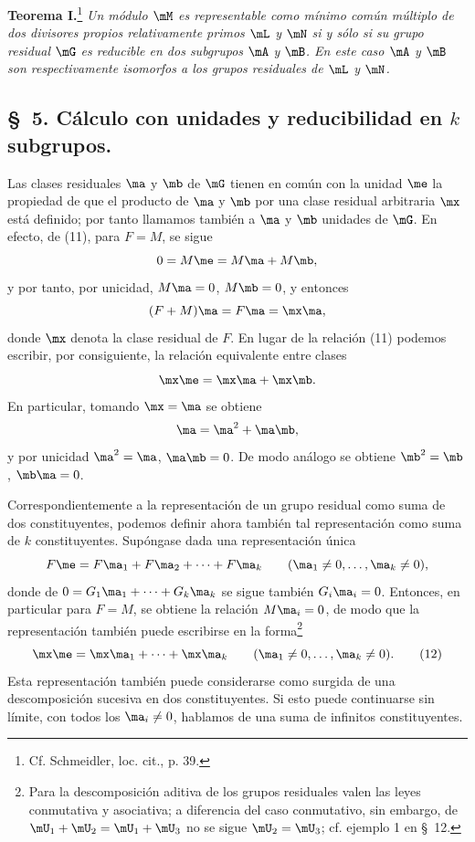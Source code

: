 \documentclass[11pt]{article}
\begin{document}
\textbf{Teorema I.}\footnote{Cf. Schmeidler, loc. cit., p. 39.} \emph{Un módulo $\mM$ es representable como mínimo común múltiplo de dos divisores propios relativamente primos $\mL$ y $\mN$ si y sólo si su grupo residual $\mG$ es reducible en dos subgrupos $\mA$ y $\mB$. En este caso $\mA$ y $\mB$ son respectivamente isomorfos a los grupos residuales de $\mL$ y $\mN$.}

\subsection*{\S~5. Cálculo con unidades y reducibilidad en $k$ subgrupos.}

Las clases residuales $\ma$ y $\mb$ de $\mG$ tienen en común con la unidad $\me$ la propiedad de que el producto de $\ma$ y $\mb$ por una clase residual arbitraria $\mx$ está definido; por tanto llamamos también a $\ma$ y $\mb$ unidades de $\mG$. En efecto, de (11), para $F=M$, se sigue
\[
 0=M\me=M\ma+M\mb,
\]
y por tanto, por unicidad, $M\ma=0$, $M\mb=0$, y entonces
\[
 (F+M)\ma=F\ma=\mx\ma,
\]
donde $\mx$ denota la clase residual de $F$. En lugar de la relación (11) podemos escribir, por consiguiente, la relación equivalente entre clases
\[
 \mx\me=\mx\ma+\mx\mb.
\]
En particular, tomando $\mx=\ma$ se obtiene
\[
 \ma=\ma^2+\ma\mb,
\]
y por unicidad $\ma^2=\ma$, $\ma\mb=0$. De modo análogo se obtiene $\mb^2=\mb$, $\mb\ma=0$.

Correspondientemente a la representación de un grupo residual como suma de dos constituyentes, podemos definir ahora también tal representación como suma de $k$ constituyentes. Supóngase dada una representación única
\[
 F\me=F\ma_1+F\ma_2+\cdots+F\ma_k\qquad(\ma_1\ne0,\ldots,\ma_k\ne0),
\]
donde de $0=G_1\ma_1+\cdots+G_k\ma_k$ se sigue también $G_i\ma_i=0$. Entonces, en particular para $F=M$, se obtiene la relación $M\ma_i=0$, de modo que la representación también puede escribirse en la forma\footnote{Para la descomposición aditiva de los grupos residuales valen las leyes conmutativa y asociativa; a diferencia del caso conmutativo, sin embargo, de $\mU_1+\mU_2=\mU_1+\mU_3$ no se sigue $\mU_2=\mU_3$; cf. ejemplo 1 en \S~12.}
\begin{equation}
 \mx\me=\mx\ma_1+\cdots+\mx\ma_k\qquad(\ma_1\ne0,\ldots,\ma_k\ne0).
\tag{12}
\end{equation}
Esta representación también puede considerarse como surgida de una descomposición sucesiva en dos constituyentes. Si esto puede continuarse sin límite, con todos los $\ma_i\ne0$, hablamos de una suma de infinitos constituyentes.
\end{document}
